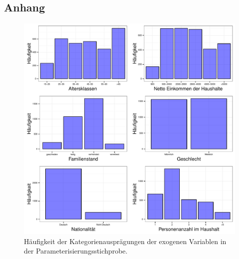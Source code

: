 \documentclass{Vorlage}
\begin{document}
\begin{appendix}

\section*{Anhang}






\begin{figure}[h]
 \begin{center}
 \includegraphics[scale=0.8]{Pictures/BarData}
 \caption{Häufigkeit der Kategorienausprägungen der exogenen Variablen in der Parameterisierungsstichprobe.}
 \label{exogen_parametrisierungsdatensatz}
 \end{center}
\end{figure}



\end{appendix}
\end{document}
